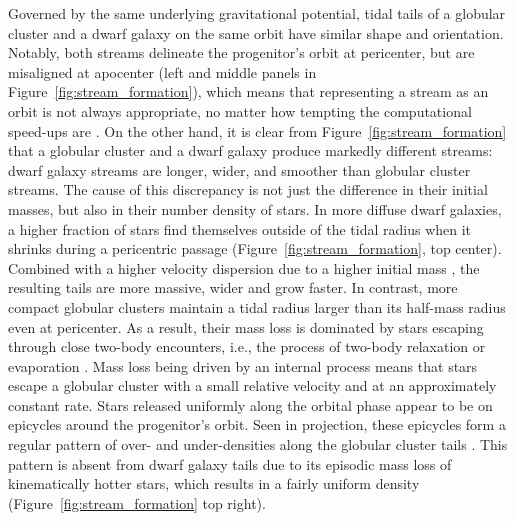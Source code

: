 \documentclass[final,5p,times,twocolumn,authoryear]{elsarticle}
\begin{document}
Governed by the same underlying gravitational potential, tidal tails of a globular cluster and a dwarf galaxy on the same orbit have similar shape and orientation.
Notably, both streams delineate the progenitor's orbit at pericenter, but are misaligned at apocenter (left and middle panels in Figure~\ref{fig:stream_formation}), which means that representing a stream as an orbit is not always appropriate, no matter how tempting the computational speed-ups are \citep{eyre:2009, eyre:2011, sanders:2013a, sanders:2013b}.
On the other hand, it is clear from Figure~\ref{fig:stream_formation} that a globular cluster and a dwarf galaxy produce markedly different streams: dwarf galaxy streams are longer, wider, and smoother than globular cluster streams.
The cause of this discrepancy is not just the difference in their initial masses, but also in their number density of stars.
In more diffuse dwarf galaxies, a higher fraction of stars find themselves outside of the tidal radius when it shrinks during a pericentric passage (Figure~\ref{fig:stream_formation}, top center).
Combined with a higher velocity dispersion due to a higher initial mass \citep[cf.][]{simon:2007, baumgardt:2019}, the resulting tails are more massive, wider and grow faster.
In contrast, more compact globular clusters maintain a tidal radius larger than its half-mass radius even at pericenter.
As a result, their mass loss is dominated by stars escaping through close two-body encounters, i.e., the process of two-body relaxation or evaporation \citep{gnedin:1997,vesperini:1997,baumgardt:2003}.
Mass loss being driven by an internal process means that stars escape a globular cluster with a small relative velocity and at an approximately constant rate.
Stars released uniformly along the orbital phase appear to be on epicycles around the progenitor's orbit.
Seen in projection, these epicycles form a regular pattern of over- and under-densities along the globular cluster tails \citep[Figure~\ref{fig:stream_formation}, bottom right;][]{kupper:2008, kupper:2010, just:2009}.
This pattern is absent from dwarf galaxy tails due to its episodic mass loss of kinematically hotter stars, which results in a fairly uniform density (Figure~\ref{fig:stream_formation} top right).
\end{document}
